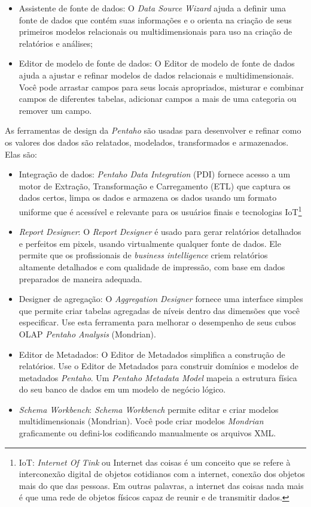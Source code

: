 \begin{itemize}
    \item Assistente de fonte de dados: O \textit{Data Source Wizard} ajuda a definir uma fonte de dados que cont\'{e}m suas informa\c{c}\~{o}es e o orienta na cria\c{c}\~{a}o de seus primeiros modelos relacionais ou multidimensionais para uso na cria\c{c}\~{a}o de relat\'orios e an\'{a}lises;
    \item Editor de modelo de fonte de dados: O Editor de modelo de fonte de dados ajuda a ajustar e refinar modelos de dados relacionais e multidimensionais. Você pode arrastar campos para seus locais apropriados, misturar e combinar campos de diferentes tabelas, adicionar campos a mais de uma categoria ou remover um campo.
\end{itemize}

As ferramentas de design da \textit{Pentaho} s\~{a}o usadas para desenvolver e refinar como os valores dos dados s\~{a}o relatados, modelados, transformados e armazenados. Elas s\~{a}o:

\begin{itemize}
    \item Integra\c{c}\~{a}o de dados: \textit{Pentaho Data Integration} (PDI) fornece acesso a um motor de Extra\c{c}\~{a}o, Transforma\c{c}\~{a}o e Carregamento (ETL) que captura os dados certos, limpa os dados e armazena os dados usando um formato uniforme que \'{e} acess\'{i}vel e relevante para os usu\'{a}rios finais e tecnologias IoT\footnote{IoT: \textit{Internet Of Tink} ou Internet das coisas \'{e} um conceito que se refere \`{a} interconex\~{a}o digital de objetos cotidianos com a internet, conex\~{a}o dos objetos mais do que das pessoas. Em outras palavras, a internet das coisas nada mais \'{e} que uma rede de objetos f\'{i}sicos capaz de reunir e de transmitir dados.}
    \item \textit{Report Designer}: O \textit{Report Designer} \'{e} usado para gerar relat\'orios detalhados e perfeitos em pixels, usando virtualmente qualquer fonte de dados. Ele permite que os profissionais de \textit{business intelligence} criem relat\'orios altamente detalhados e com qualidade de impress\~{a}o, com base em dados preparados de maneira adequada.
    \item Designer de agrega\c{c}\~{a}o: O \textit{Aggregation Designer} fornece uma interface simples que permite criar tabelas agregadas de n\'{i}veis dentro das dimens\~{o}es que você especificar. Use esta ferramenta para melhorar o desempenho de seus cubos OLAP \textit{Pentaho Analysis} (Mondrian).
    \item Editor de Metadados: O Editor de Metadados simplifica a constru\c{c}\~{a}o de relat\'orios. Use o Editor de Metadados para construir dom\'{i}nios e modelos de metadados \textit{Pentaho}. Um \textit{Pentaho Metadata Model} mapeia a estrutura f\'{i}sica do seu banco de dados em um modelo de neg\'ocio l\'ogico.
    \item \textit{Schema Workbench}: \textit{Schema Workbench} permite editar e criar modelos multidimensionais (Mondrian). Você pode criar modelos \textit{Mondrian} graficamente ou defini-los codificando manualmente os arquivos XML.
\end{itemize}

